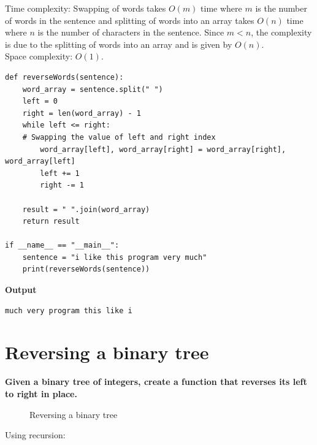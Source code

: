 \documentclass[a4paper,11pt]{book}
\begin{document}
\noindent Time complexity: Swapping of words takes $O(m)$ time where $m$ is the number of words in the sentence and splitting of words into an array takes $O(n)$ time where $n$ is the number of characters in the sentence. Since $m<n$, the complexity is due to the splitting of words into an array and is given by $O(n)$.\\
\noindent Space complexity: $O(1)$.
\begin{lstlisting}
def reverseWords(sentence):
    word_array = sentence.split(" ")
    left = 0
    right = len(word_array) - 1
    while left <= right:
    # Swapping the value of left and right index
        word_array[left], word_array[right] = word_array[right], word_array[left]
        left += 1
        right -= 1

    result = " ".join(word_array)
    return result

if __name__ == "__main__":
    sentence = "i like this program very much"
    print(reverseWords(sentence))
\end{lstlisting}
\textbf{Output}
\begin{lstlisting}
much very program this like i
\end{lstlisting}

\newpage
\section{Reversing a binary tree}

\textbf{Given a binary tree of integers, create a function that reverses its left to right in place.}
\vspace{5mm}
\begin{figure}[ht]
\begin{center}
\vspace{7mm}
\end{center}
\caption{Reversing a binary tree}
\end{figure}
\noindent Using recursion:
\end{document}
